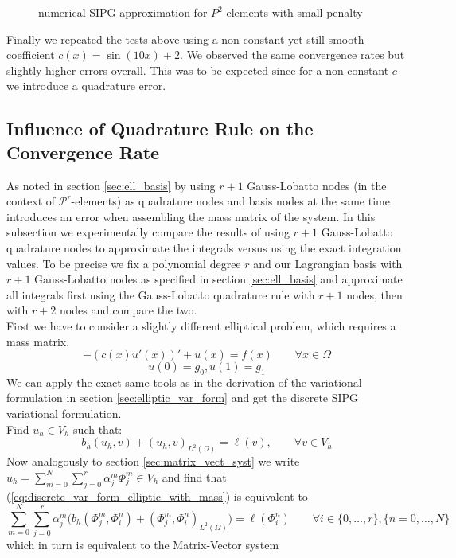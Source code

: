 \begin{figure}[h!]
\begin{minipage}[t]{0.48\textwidth}
        \caption{numerical SIPG-approximation for $P^2$-elements with small penalty}
        \label{fig:elliptic_uniform_mesh_sol_p2_non_coercive}
    \end{minipage}
\end{figure}

Finally we repeated the tests above using a non constant yet still smooth coefficient $c(x) = \sin(10x) + 2$. We observed the same convergence rates but slightly higher
errors overall. This was to be expected since for a non-constant $c$ we introduce a quadrature error. 

\subsection{Influence of Quadrature Rule on the Convergence Rate}
As noted in section \ref{sec:ell_basis} by using $r+1$ Gauss-Lobatto nodes (in the context of $\mathcal{P}^r$-elements) as quadrature nodes and basis nodes at the same time
introduces an error when assembling the mass matrix of the system. In this subsection we experimentally compare the results of using $r+1$ Gauss-Lobatto quadrature nodes
to approximate the integrals versus using the exact integration values. To be precise we fix a polynomial degree $r$ and our Lagrangian basis with $r+1$ Gauss-Lobatto nodes
as specified in section \ref{sec:ell_basis} and approximate all integrals first using the Gauss-Lobatto quadrature rule with $r+1$ nodes, then with $r+2$ nodes and compare the two.
\\
First we have to consider a slightly different elliptical problem, which requires a mass matrix. 
\begin{equation}
	\label{eq:elliptic_pde}
	-(c(x)u'(x))' + u(x) = f(x) \qquad \forall x\in \Omega \nonumber
\end{equation}
\begin{equation}
	\label{eq:elliptic_pde_bc}
	u(0) = g_0, u(1) = g_1 \nonumber
\end{equation}
We can apply the exact same tools as in the derivation of the variational formulation in section \ref{sec:elliptic_var_form} and get the discrete SIPG variational formulation. \\
Find $u_h \in V_h$ such that:
\begin{equation}
	\label{eq:discrete_var_form_elliptic_with_mass}
	b_h(u_h, v) + (u_h, v)_{L^2(\Omega)} = \ell(v), \qquad \forall v\in V_h 
\end{equation}
Now analogously to section \ref{sec:matrix_vect_syst} we write $u_h = \sum_{m=0}^{N} \sum_{j=0}^r \alpha_j^m \Phi_j^m \in V_h$ and find that (\ref{eq:discrete_var_form_elliptic_with_mass})
is equivalent to \\
\begin{equation*}
	\sum_{m=0}^{N} \sum_{j=0}^r \alpha_j^m \Big(b_h(\Phi_j^m, \Phi_i^n) + (\Phi_j^m, \Phi_i^n)_{L^2(\Omega)}\Big) = \ell(\Phi_i^n) \qquad \forall i \in \{0,\ldots,r\}, \{n = 0,\ldots,N\}
\end{equation*}
which in turn is equivalent to the Matrix-Vector system

